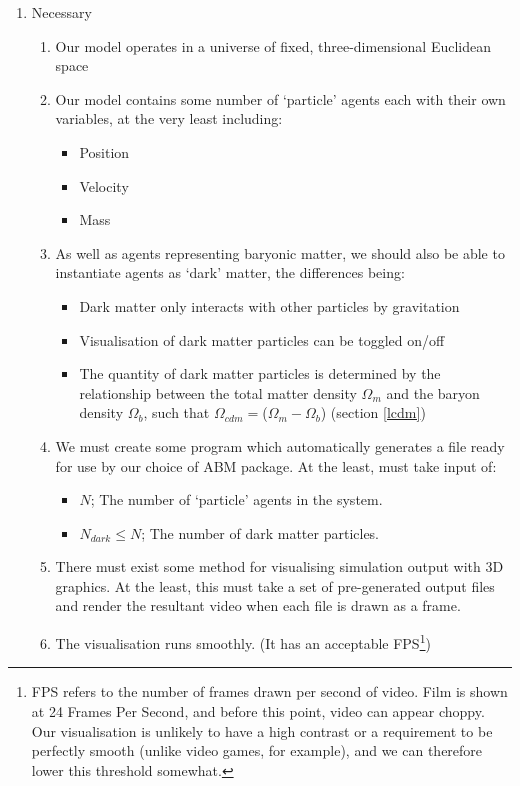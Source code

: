 \documentclass[11pt,a4paper]{article}
\begin{document}
\begin{enumerate}
  \item Necessary
  \begin{enumerate}
    \item Our model operates in a universe of fixed, three-dimensional Euclidean space \label{n1}
    \item Our model contains some number of `particle' agents each with their own variables, at the very least including: \label{n2}
    \begin{itemize}
      \item{Position}
      \item{Velocity}
      \item{Mass}
    \end{itemize}
    \item As well as agents representing baryonic matter, we should also be able to instantiate agents as `dark' matter, the differences being: \label{n3}
    \begin{itemize}
      \item Dark matter only interacts with other particles by gravitation
      \item Visualisation of dark matter particles can be toggled on/off
      \item The quantity of dark matter particles is determined by the relationship between the total matter density $\Omega_{m}$ and the baryon density $\Omega_{b}$, such that $\Omega_{cdm}=$($\Omega_{m}-\Omega_{b}$) (section \ref{lcdm})
    \end{itemize}
    \item We must create some program which automatically generates a file ready for use by our choice of ABM package. At the least, must take input of: \label{n4}
    \begin{itemize}
      \item $N$; The number of `particle' agents in the system.
      \item $N_{dark} \leq N$; The number of dark matter particles.
    \end{itemize}
    \item There must exist some method for visualising simulation output with 3D graphics. At the least, this must take a set of pre-generated output files and render the resultant video when each file is drawn as a frame. \label{n5}
    \item The visualisation runs smoothly. (It has an acceptable FPS\footnote{FPS refers to the number of frames drawn per second of video. Film is shown at 24 Frames Per Second, and before this point, video can appear choppy. Our visualisation is unlikely to have a high contrast or a requirement to be perfectly smooth (unlike video games, for example), and we can therefore lower this threshold somewhat.})\label{n6}

\end{enumerate}
\end{enumerate}
\end{document}
